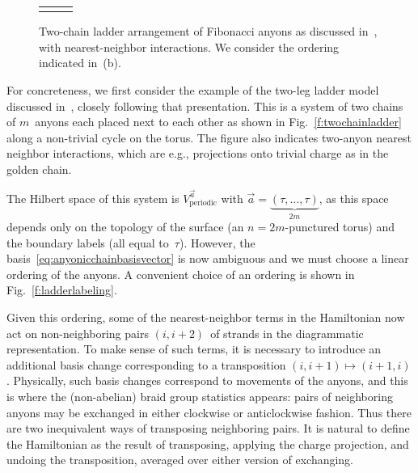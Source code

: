 \documentclass[floats,prb,twocolumn]{revtex4}
\newcommand*{\twochain}{\raisebox{-23.283pt}{\epsfig{file=twochain2.eps,clip=}}}
\newcommand*{\twochainnumbered}{\raisebox{-23.283pt}{\epsfig{file=twochainnumbered3.eps,clip=}}}
\begin{document}
 
\begin{figure}  
\centering
\begin{tabular}{ccc}
\subfigure[]{\hspace{-0.6cm}{\label{f:twochainladder}\scalebox{0.8}{\twochain}}}
&
\subfigure[]{\hspace{-0.6cm}\label{f:ladderlabeling}\scalebox{0.8}{\twochainnumbered}}
\end{tabular}
\caption{Two-chain ladder arrangement of Fibonacci anyons as discussed in~\cite{Trebstetal08}, with nearest-neighbor interactions. We consider the ordering indicated in~(b). \label{fig:twochainladder}}
\end{figure}

For concreteness, we first consider the example of  the two-leg ladder model discussed in~\cite{Trebstetal08}, closely following that presentation. This is a system of two chains of $m$~anyons each  placed next to each other as shown in Fig.~\ref{f:twochainladder} along a non-trivial cycle on the torus. The figure also indicates two-anyon nearest neighbor interactions, which are e.g., projections onto trivial charge as in the golden chain. 

The Hilbert space of this system is $V^{\vec{a}}_{\textrm{periodic}}$ with $\vec{a}=\underbrace{(\tau,\ldots,\tau)}_{2m}$, as this space depends only on the topology of the surface (an $n=2m$-punctured torus) and the boundary labels (all equal to~$\tau$).  However, the basis~\eqref{eq:anyonicchainbasisvector} is now ambiguous and we must choose a linear ordering of the anyons. A convenient choice of an ordering is shown in Fig.~\ref{f:ladderlabeling}. 

Given this ordering, some of the nearest-neighbor terms in the Hamiltonian
now act on  non-neighboring pairs $(i,i+2)$~of strands  in the diagrammatic representation. To make sense of such terms, it is necessary to introduce an additional basis change corresponding to a transposition $(i,i+1)\mapsto (i+1,i)$. Physically, such basis changes correspond to movements of the anyons, and this is where the (non-abelian) braid group statistics appears: pairs of neighboring anyons may be exchanged in either clockwise or anticlockwise fashion. Thus there are two inequivalent ways of transposing neighboring pairs.   It is natural to define the Hamiltonian  as the result of transposing, applying the charge projection, and undoing the transposition, averaged over either version of exchanging. 
\end{document}
